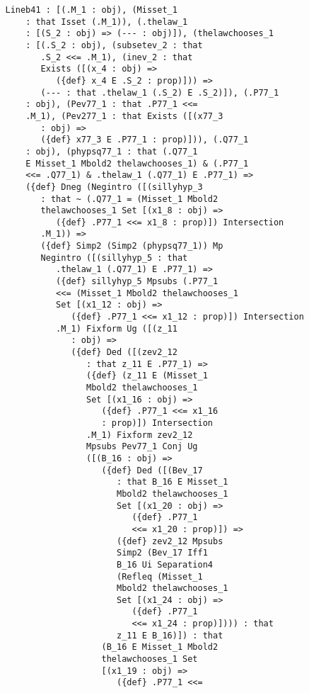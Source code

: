 \documentclass[12pt]{article}
\begin{document}
\begin{verbatim}
   Lineb41 : [(.M_1 : obj), (Misset_1 
       : that Isset (.M_1)), (.thelaw_1 
       : [(S_2 : obj) => (--- : obj)]), (thelawchooses_1 
       : [(.S_2 : obj), (subsetev_2 : that 
          .S_2 <<= .M_1), (inev_2 : that 
          Exists ([(x_4 : obj) => 
             ({def} x_4 E .S_2 : prop)])) => 
          (--- : that .thelaw_1 (.S_2) E .S_2)]), (.P77_1 
       : obj), (Pev77_1 : that .P77_1 <<= 
       .M_1), (Pev277_1 : that Exists ([(x77_3 
          : obj) => 
          ({def} x77_3 E .P77_1 : prop)])), (.Q77_1 
       : obj), (phypsq77_1 : that (.Q77_1 
       E Misset_1 Mbold2 thelawchooses_1) & (.P77_1 
       <<= .Q77_1) & .thelaw_1 (.Q77_1) E .P77_1) => 
       ({def} Dneg (Negintro ([(sillyhyp_3 
          : that ~ (.Q77_1 = (Misset_1 Mbold2 
          thelawchooses_1 Set [(x1_8 : obj) => 
             ({def} .P77_1 <<= x1_8 : prop)]) Intersection 
          .M_1)) => 
          ({def} Simp2 (Simp2 (phypsq77_1)) Mp 
          Negintro ([(sillyhyp_5 : that 
             .thelaw_1 (.Q77_1) E .P77_1) => 
             ({def} sillyhyp_5 Mpsubs (.P77_1 
             <<= (Misset_1 Mbold2 thelawchooses_1 
             Set [(x1_12 : obj) => 
                ({def} .P77_1 <<= x1_12 : prop)]) Intersection 
             .M_1) Fixform Ug ([(z_11 
                : obj) => 
                ({def} Ded ([(zev2_12 
                   : that z_11 E .P77_1) => 
                   ({def} (z_11 E (Misset_1 
                   Mbold2 thelawchooses_1 
                   Set [(x1_16 : obj) => 
                      ({def} .P77_1 <<= x1_16 
                      : prop)]) Intersection 
                   .M_1) Fixform zev2_12 
                   Mpsubs Pev77_1 Conj Ug 
                   ([(B_16 : obj) => 
                      ({def} Ded ([(Bev_17 
                         : that B_16 E Misset_1 
                         Mbold2 thelawchooses_1 
                         Set [(x1_20 : obj) => 
                            ({def} .P77_1 
                            <<= x1_20 : prop)]) => 
                         ({def} zev2_12 Mpsubs 
                         Simp2 (Bev_17 Iff1 
                         B_16 Ui Separation4 
                         (Refleq (Misset_1 
                         Mbold2 thelawchooses_1 
                         Set [(x1_24 : obj) => 
                            ({def} .P77_1 
                            <<= x1_24 : prop)]))) : that 
                         z_11 E B_16)]) : that 
                      (B_16 E Misset_1 Mbold2 
                      thelawchooses_1 Set 
                      [(x1_19 : obj) => 
                         ({def} .P77_1 <<= 

\end{verbatim}
\end{document}
